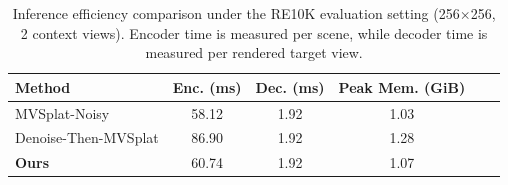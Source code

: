 \begin{table}[ht]
\centering
    \small
    \caption{Inference efficiency comparison under the RE10K evaluation setting (256$\times$256, 2 context views). Encoder time is measured per scene, while decoder time is measured per rendered target view.}
    \begin{tabular}{lccccc}
    \toprule
    Method & Enc. (ms) & Dec. (ms) & Peak Mem. (GiB) \\
    \midrule
    MVSplat-Noisy & 58.12 & 1.92 & 1.03 \\
    Denoise-Then-MVSplat  & 86.90 & 1.92 & 1.28 \\
    \textbf{Ours} & 60.74 & 1.92 & 1.07 \\
    \bottomrule
    \end{tabular}
    \label{tab:efficiency}
\end{table}
